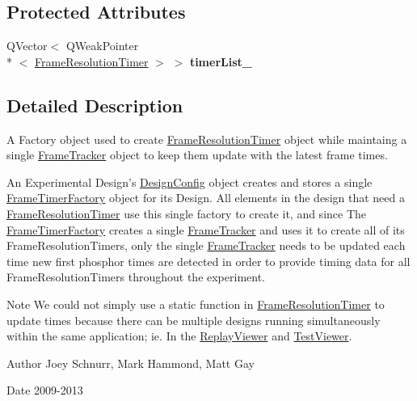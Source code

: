 \subsection*{Protected Attributes}
\begin{DoxyCompactItemize}
\item 
\hypertarget{class_picto_1_1_controller_1_1_frame_timer_factory_a7d968874245a85c6ac89c27f034a8a06}{Q\-Vector$<$ Q\-Weak\-Pointer\\*
$<$ \hyperlink{class_picto_1_1_controller_1_1_frame_resolution_timer}{Frame\-Resolution\-Timer} $>$ $>$ {\bfseries timer\-List\-\_\-}}\label{class_picto_1_1_controller_1_1_frame_timer_factory_a7d968874245a85c6ac89c27f034a8a06}

\end{DoxyCompactItemize}


\subsection{Detailed Description}
A Factory object used to create \hyperlink{class_picto_1_1_controller_1_1_frame_resolution_timer}{Frame\-Resolution\-Timer} object while maintaing a single \hyperlink{struct_picto_1_1_controller_1_1_frame_tracker}{Frame\-Tracker} object to keep them update with the latest frame times. 

An Experimental Design's \hyperlink{class_picto_1_1_design_config}{Design\-Config} object creates and stores a single \hyperlink{class_picto_1_1_controller_1_1_frame_timer_factory}{Frame\-Timer\-Factory} object for its Design. All elements in the design that need a \hyperlink{class_picto_1_1_controller_1_1_frame_resolution_timer}{Frame\-Resolution\-Timer} use this single factory to create it, and since The \hyperlink{class_picto_1_1_controller_1_1_frame_timer_factory}{Frame\-Timer\-Factory} creates a single \hyperlink{struct_picto_1_1_controller_1_1_frame_tracker}{Frame\-Tracker} and uses it to create all of its Frame\-Resolution\-Timers, only the single \hyperlink{struct_picto_1_1_controller_1_1_frame_tracker}{Frame\-Tracker} needs to be updated each time new first phosphor times are detected in order to provide timing data for all Frame\-Resolution\-Timers throughout the experiment. \begin{DoxyNote}{Note}
We could not simply use a static function in \hyperlink{class_picto_1_1_controller_1_1_frame_resolution_timer}{Frame\-Resolution\-Timer} to update times because there can be multiple designs running simultaneously within the same application; ie. In the \hyperlink{class_replay_viewer}{Replay\-Viewer} and \hyperlink{class_test_viewer}{Test\-Viewer}. 
\end{DoxyNote}
\begin{DoxyAuthor}{Author}
Joey Schnurr, Mark Hammond, Matt Gay 
\end{DoxyAuthor}
\begin{DoxyDate}{Date}
2009-\/2013 
\end{DoxyDate}


